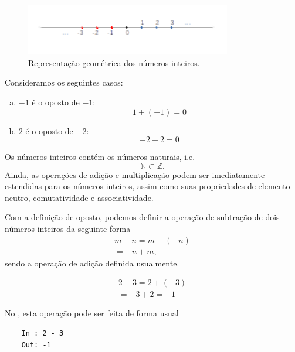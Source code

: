 \begin{figure}[H]
  \centering
  \includegraphics[width=0.8\textwidth]{./cap_numreal/dados/fig_reprgeoZ/main}
  \caption{Representação geométrica dos números inteiros.}
  \label{fig:reprgeoZ}
\end{figure}

\begin{ex}
  Consideramos os seguintes casos:
  \begin{enumerate}[a)]
  \item $-1$ é o oposto de $-1$:
    \begin{equation}
      1 + (-1) = 0
    \end{equation}
  \item $2$ é o oposto de $-2$:
    \begin{equation}
      -2 + 2 = 0
    \end{equation}
  \end{enumerate}
\end{ex}

Os números inteiros contém os números naturais, i.e.
\begin{equation}
  \mathbb{N} \subset \mathbb{Z}.
\end{equation}
Ainda, as operações de adição e multiplicação podem ser imediatamente estendidas para os números inteiros, assim como suas propriedades de elemento neutro, comutatividade e associatividade.

Com a definição de oposto, podemos definir a operação de subtração de dois números inteiros da seguinte forma
\begin{gather}
  m - n = m + (-n) \\
  = -n + m,
\end{gather}
sendo a operação de adição definida usualmente.

\begin{ex}
  \begin{gather}
    2 - 3 = 2 + (-3) \\
    = -3 + 2 = -1
  \end{gather}

  \ifispython
  No \python, esta operação pode ser feita de forma usual
  \begin{lstlisting}
    In : 2 - 3
    Out: -1
  \end{lstlisting}
  \fi
\end{ex}

